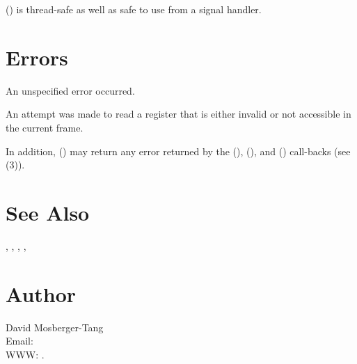 \documentclass{article}
\begin{document}
() is thread-safe as well as safe to use
from a signal handler.

\section{Errors}

\begin{Description}
\item[\Const{UNW\_EUNSPEC}] An unspecified error occurred.
\item[\Const{UNW\_EBADREG}] An attempt was made to read a register
  that is either invalid or not accessible in the current frame.
\end{Description}
In addition, () may return any error returned by
the (), (), and
() call-backs (see
(3)).

\section{See Also}

,
,
,
,

\section{Author}

\noindent
David Mosberger-Tang\\
Email: \\
WWW: .
\LatexManEnd
\end{document}
